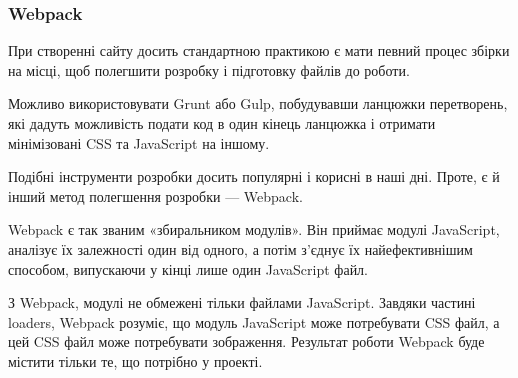 \subsubsection{Webpack}

При створенні сайту досить стандартною практикою є мати певний процес збірки на місці, щоб полегшити розробку і підготовку файлів до роботи.

Можливо використовувати Grunt або Gulp, побудувавши ланцюжки перетворень, які дадуть можливість подати код в один кінець ланцюжка і отримати мінімізовані CSS та JavaScript на іншому.

Подібні інструменти розробки досить популярні і корисні в наші дні. Проте, є й інший метод полегшення розробки — Webpack.

Webpack є так званим «збиральником модулів». Він приймає модулі JavaScript, аналізує їх залежності один від одного, а потім з'єднує їх найефективнішим способом, випускаючи у кінці лише один JavaScript файл.

З Webpack, модулі не обмежені тільки файлами JavaScript. Завдяки частині loaders, Webpack розуміє, що модуль JavaScript може потребувати CSS файл, а цей CSS файл може потребувати зображення. Результат роботи Webpack буде містити тільки те, що потрібно у проекті.
